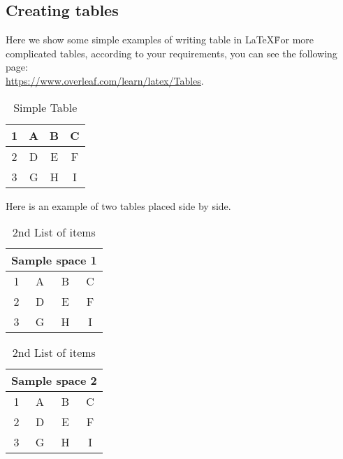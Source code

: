 \documentclass[11pt,leqno]{amsart}
\numberwithin{equation}{subsection}
\theoremstyle{definition}
\begin{document}
\subsection{Creating tables}
Here we show some simple examples of writing table in \LaTeX\. For more complicated tables, according to your requirements, 
you can see the following page: \\
\noindent 
\href{https://www.overleaf.com/learn/latex/Tables}{https://www.overleaf.com/learn/latex/Tables}. 

\begin{table}[h!]
	\centering
	\begin{tabular}{|c|c|c|c|}
		\hline %
		1 & A & B & C \\ 
		\hline
		2 & D & E & F \\ 
		\hline
		3 & G & H & I \\ 
		\hline
	\end{tabular}
	\caption{Simple Table}
	\label{table:0}
\end{table}

\noindent
Here is an example of two tables placed side by side. 
\begin{center}
	\begin{table}[h!] %
		\parbox{.45\linewidth}{
			\centering 
			\begin{tabular}{|c|c|c|c|}
				\hline
				\multicolumn{4}{|c|}{Sample space 1} \\ 
				\hline
				1 & A & B & C \\ 
				\hline
				2 & D & E & F \\ 
				\hline
				3 & G & H & I \\ 
				\hline
			\end{tabular}
		\caption{1st List of items}
		\label{table:1} 
		}
		\hfill
		\parbox{.45\linewidth}{
			\centering 
			\begin{tabular}{|c|c|c|c|}
				\hline
				\multicolumn{4}{|c|}{Sample space 2} \\ 
				\hline
				1 & A & B & C \\ 
				\hline
				2 & D & E & F \\ 
				\hline
				3 & G & H & I \\ 
				\hline
			\end{tabular}
			\caption{2nd List of items}
			\label{table:2}
		}
	\end{table}
\end{center}
\end{document}
